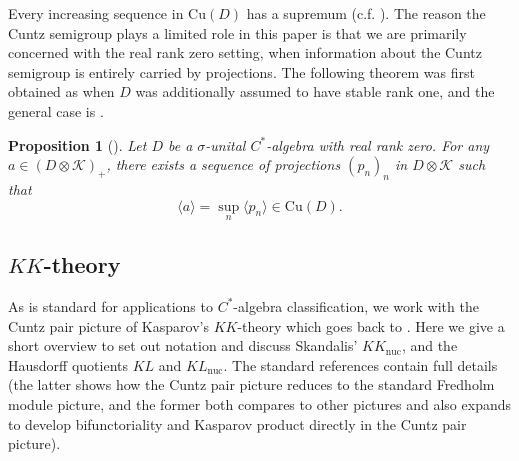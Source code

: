\documentclass[reqno]{amsart}
\newtheorem{prop}[thm]{Proposition}
\theoremstyle{definition}
\theoremstyle{remark}
\numberwithin{equation}{section}
\theoremstyle{definition}
\newcommand{\calK}{\mathcal{K}}
\begin{document}
Every increasing sequence in $\mathrm{Cu}(D)$ has a supremum (c.f. \cite[Theorem 3.8]{modern-cuntz}). The reason the Cuntz semigroup plays a limited role in this paper is that we are primarily concerned with the real rank zero setting, when information about the Cuntz semigroup is entirely carried by projections.  The following theorem was first obtained as \cite[Theorem 2.8]{Perera_RR0_SR1} when $D$ was additionally assumed to have stable rank one, and the general case is \cite[Theorem 5.7]{RR0_Cuntz}. 

\begin{prop}[{\cite[Theorem 5.7]{RR0_Cuntz}}] 
\label{RR0_Cu} 
Let $D$ be a $\sigma$-unital $C^*$-algebra with real rank zero. For any $a\in (D\otimes \calK)_{+}$, there exists a sequence of projections $(p_{n})_{n}$ in $D\otimes \calK$ such that 
\begin{equation} 
\langle a\rangle = \sup_{n} \langle p_{n} \rangle \in \mathrm{Cu}(D). 
\end{equation}  
\end{prop} 

\subsection{$KK$-theory} 
As is standard for applications to $C^*$-algebra classification, we work with the Cuntz pair picture of Kasparov's $KK$-theory which goes back to \cite{Cuntz:GeneralizedHM}. Here we give a short overview to set out notation and discuss Skandalis' $KK_{\mathrm{nuc}}$, and the Hausdorff quotients $KL$ and $KL_{\mathrm{nuc}}$. The standard references \cite{Elements_KK, Blackadar_K} contain full details (the latter shows how the Cuntz pair picture reduces to the standard Fredholm module picture, and the former both compares to other pictures and also expands \cite{Thomsen:Homotopy} to develop bifunctoriality and Kasparov product directly in the Cuntz pair picture).
\end{document}
